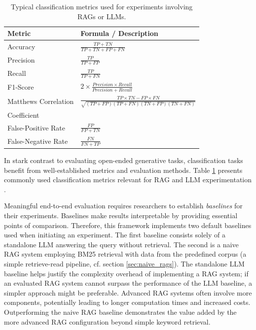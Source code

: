{\renewcommand{\arraystretch}{1.5}%
\begin{table}
  \centering
 \begin{tabular}{|l|l|}
  \hline
  \textbf{Metric} & \textbf{Formula / Description} \\[3pt]
  \hline Accuracy & $\frac{TP + TN}{TP + TN + FP + FN}$\\[5pt]
  \hline Precision & $\frac{TP}{TP + FP}$\\[5pt]
  \hline Recall & $\frac{TP}{TP + FN}$\\[2pt]
  \hline F1-Score & $2 \times \frac{Precision \times Recall}{Precision + Recall}$\\[2pt]
  \hline Matthews Correlation & $\frac{TP \times TN - FP \times FN}{\sqrt{(TP + FP)(TP + FN)(TN + FP)(TN + FN)}}$\\Coefficient & \\[2pt]
  \hline False-Positive Rate & $\frac{FP}{FP + TN}$\\[2pt]
  \hline False-Negative Rate & $\frac{FN}{FN + TP}$\\[2pt]
  \hline
 \end{tabular}
 \caption{Typical classification metrics used for experiments involving RAGs or LLMs\cite{Hou.8212023,Zeng.28.03.2024}.}
 \label{table:classification_metrics}
\end{table}}

In stark contrast to evaluating open-ended generative tasks, classification tasks benefit from well-established metrics and evaluation methods. Table \ref{table:classification_metrics} presents commonly used classification metrics relevant for RAG and LLM experimentation \cite{Hou.8212023,Zeng.28.03.2024}.

Meaningful end-to-end evaluation requires researchers to establish \textit{baselines} for their experiments. Baselines make results interpretable by providing essential points of comparison. Therefore, this framework implements two default baselines used when initiating an experiment. The first baseline consists solely of a standalone LLM answering the query without retrieval. The second is a naive RAG system employing BM25 retrieval with data from the predefined corpus (a simple retrieve-read pipeline, cf. section \ref{sec:naive_rags}). The standalone LLM baseline helps justify the complexity overhead of implementing a RAG system; if an evaluated RAG system cannot surpass the performance of the LLM baseline, a simpler approach might be preferable. Advanced RAG systems often involve more components, potentially leading to longer computation times and increased costs. Outperforming the naive RAG baseline demonstrates the value added by the more advanced RAG configuration beyond simple keyword retrieval.

